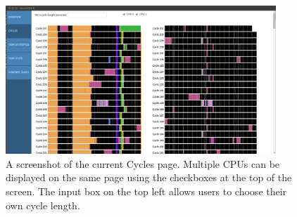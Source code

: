 \documentclass{hmcclinic}
\begin{document}
\begin{figure}[H]
\begin{center}
\includegraphics[width=4in]{cycles-page.png}
\caption{A screenshot of the current Cycles page. Multiple CPUs can be displayed
on the same page using the checkboxes at the top of the screen. The input box on the top
left allows users to choose their own cycle length.}
\end{center}
\end{figure}
\end{document}
